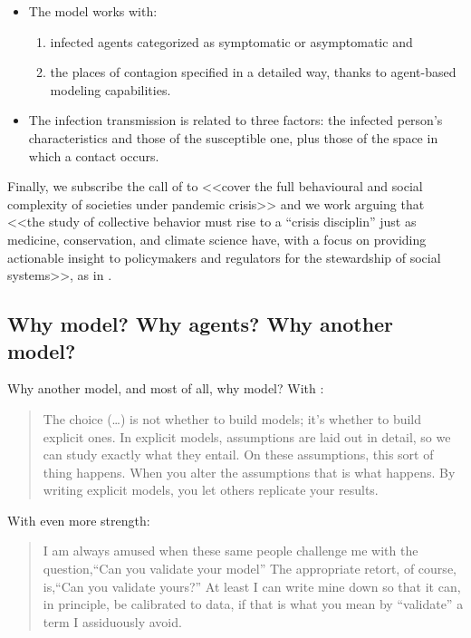 \documentclass[graybox]{svmult}
\begin{document}
\begin{itemize}

\item

The model works with: 

\begin{enumerate}[label=\roman*]
\item infected agents categorized as symptomatic or asymptomatic and 
\item the places of contagion specified in a detailed way, thanks to agent-based modeling capabilities. 
\end{enumerate}

 \item
The infection transmission is related to three factors: the infected person's characteristics and those of the susceptible one, plus those of the space in which a contact occurs.

\end{itemize}


Finally, we subscribe the call of \cite{squazzoni2020} to <<cover the full behavioural and social complexity of societies under pandemic crisis>> and we work arguing that <<the study of collective behavior must rise to a ``crisis disciplin'' just as medicine, conservation, and climate science have, with a focus on providing actionable insight to policymakers and regulators for the stewardship of social systems>>, as in \cite{Bak-Colemane2025764118}. 

\subsection{Why model? Why agents? Why another model?}
\label{why}

Why another model, and most of all, why model? With \cite{epstein2008model}:
\begin{quote}
The choice (\ldots) is not whether to build models; it's whether to build explicit ones. In explicit models, assumptions are laid out in detail, so we can study exactly what they entail. On these assumptions, this sort of thing happens. When you alter the assumptions that is what happens. By writing explicit models, you let others replicate your results.
\end{quote}

With even more strength:
\begin{quote} 
I am always amused when these same people challenge me with the question,``Can you validate your model'' The appropriate retort, of course, is,``Can you validate yours?'' At least I can write mine down so that it can, in principle, be calibrated to data, if that is what you mean by ``validate'' a term I assiduously avoid.
\end{quote}
\end{document}
